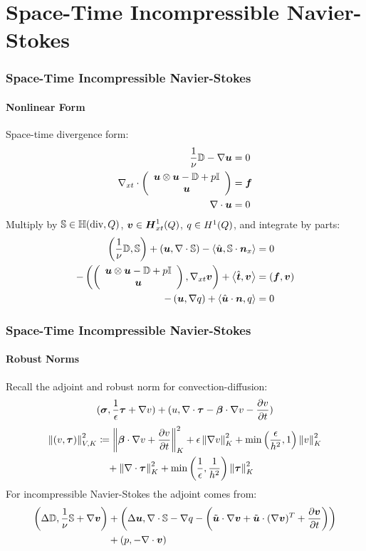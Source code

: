 \documentclass[18pt,xcolor=table]{beamer}
\begin{document}
\section{Space-Time Incompressible Navier-Stokes}
\begin{frame}[t]
\frametitle{Space-Time Incompressible Navier-Stokes}
\framesubtitle{Nonlinear Form}
Space-time divergence form:
\begin{align*}
  \frac{1}{\nu}\bbD-\Grad\bfu&=0\\
  \Divxt\vecttwo{\bfu\otimes\bfu-\bbD+p\bbI}{\bfu}&=\bff\\
  \Div\bfu&=0
\end{align*}
Multiply by $\bbS\in\bbH(\text{div},Q)$, $\bfv\in\bfH^1_{xt}(Q)$, $q\in\HonexQ$, 
and integrate by parts:
\begin{align*}
  \LRp{\frac{1}{\nu}\bbD,\bbS}
  +\LRp{\bfu,\Div\bbS}
  -\LRa{\hat\bfu,\bbS\cdot\bfn_x}&=0\\
  -\LRp{\vecttwo{\bfu\otimes\bfu-\bbD+p\bbI}{\bfu},\Gradxt\bfv}
  +\LRa{\hat\bft,\bfv}
  &=(\bff,\bfv)\\
  -\LRp{\bfu,\Grad q}
  +\LRa{\hat{\bfu}\cdot\bfn,q}&=0
\end{align*}
\end{frame}



\begin{frame}[t]
\frametitle{Space-Time Incompressible Navier-Stokes}
\framesubtitle{Robust Norms}
Recall the adjoint and robust norm for convection-diffusion:
\begin{equation*}
  (\bfsigma,\frac{1}{\epsilon}\bftau+\Grad v)+(u,\Div\bftau-\bfbeta\cdot\Grad v-\pd{v}{t})
\end{equation*}
\begin{align*}
\norm{\LRp{v,\bftau}}_{V,K}^2 &\coloneqq
\norm{\bfbeta\cdot\Grad v+\pd{v}{t}}_K^2
+ \epsilon\norm{\Grad v}_K^2
+ \min\LRp{\frac{\epsilon}{h^2},1}\norm{v}^2_K
\\\nonumber&\quad
+ \norm{\Div \bftau}_K^2
+ \min\LRp{\frac{1}{\epsilon},\frac{1}{h^2}}\norm{\bftau}_K^2
\end{align*}
For incompressible Navier-Stokes the adjoint comes from:
\begin{align*}
  \LRp{\Delta\bbD,\frac{1}{\nu}\bbS+\Grad\bfv}
  &+\LRp{\Delta\bfu,\Div\bbS-\Grad q-\LRp{\tilde\bfu\cdot\Grad\bfv +\tilde\bfu\cdot(\Grad\bfv)^T+\pd{\bfv}{t}}}
  \\&+\LRp{p,-\Div\bfv}
\end{align*}
\end{frame}
\end{document}
